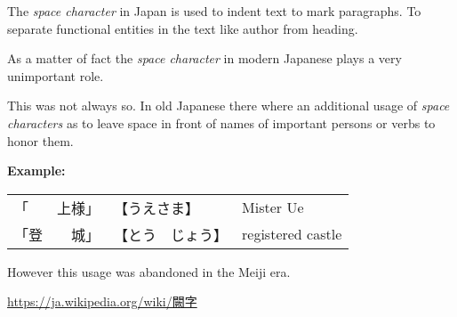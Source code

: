 The \textit{space character} in Japan is used to indent text to mark
paragraphs. To separate functional entities in the text like author from
heading.

As a matter of fact the \textit{space character} in modern Japanese plays a
very unimportant role.

This was not always so. In old Japanese there where an additional usage of
\textit{space characters} as  to leave
space in front of names of important persons or verbs to honor them.

\smallskip
\textbf{Example:}

\begin{center}\Padding\begin{tabular}{p{4cm}p{3cm}p{4cm}}
 {「　　上様」} & {【うえさま】}      & Mister Ue \\
 {「登　　城」} &  {【とう　じょう】} & registered castle\\
\end{tabular}\end{center}
\smallskip

However this usage was abandoned in the Meiji era.

\Link \href{https://ja.wikipedia.org/wiki/%E9%97%95%E5%AD%97}{https://ja.wikipedia.org/wiki/闕字}

